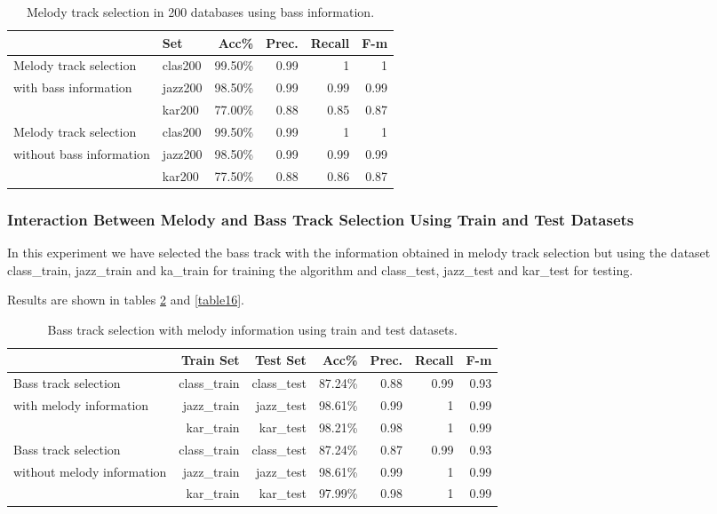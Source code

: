 \documentclass{article}
\begin{document}
\begin{table}
\begin{center}
\begin{tabular}{  l | l | r | r | r | r }
\hline
 & Set & Acc\% & Prec. & Recall & F-m \\
\hline
\hline
Melody track selection  & clas200 & 99.50\% & 0.99 & 1 & 1 \\
with bass information & jazz200 & 98.50\% & 0.99 & 0.99 & 0.99 \\
 & kar200 & 77.00\% & 0.88 & 0.85 & 0.87 \\
\hline
Melody track selection  & clas200 & 99.50\% & 0.99 & 1 & 1 \\
without bass information & jazz200 & 98.50\% & 0.99 & 0.99 & 0.99 \\
 & kar200 & 77.50\% & 0.88 & 0.86 & 0.87 \\
\hline
\end{tabular}
\caption{Melody track selection in 200 databases using bass information.}
\label{table14}
\end{center}
\end{table}




\subsubsection{Interaction Between Melody and Bass Track Selection Using Train and Test Datasets}

In this experiment we have selected the bass track with the information obtained in melody track selection but using the dataset class\_train, jazz\_train and ka\_train for training the algorithm and class\_test, jazz\_test and kar\_test for testing.

Results are shown in tables \ref{table15} and \ref{table16}.


\begin{table}
\begin{center}
\begin{tabular}{  l | r | r | r | r | r | r }
\hline
 & Train Set & Test Set & Acc\% & Prec. & Recall & F-m \\
\hline
\hline
Bass track selection  & class\_train & class\_test & 87.24\% & 0.88 & 0.99 & 0.93 \\
with melody information & jazz\_train & jazz\_test & 98.61\% & 0.99 & 1 & 0.99 \\
 & kar\_train & kar\_test & 98.21\% & 0.98 & 1 & 0.99 \\
\hline
Bass track selection  & class\_train & class\_test & 87.24\% & 0.87 & 0.99 & 0.93 \\
without melody information & jazz\_train & jazz\_test & 98.61\% & 0.99 & 1 & 0.99 \\
 & kar\_train & kar\_test & 97.99\% & 0.98 & 1 & 0.99 \\
\hline
\end{tabular}
\caption{Bass track selection with melody information using train and test datasets.}
\label{table15}
\end{center}
\end{table}
\end{document}

